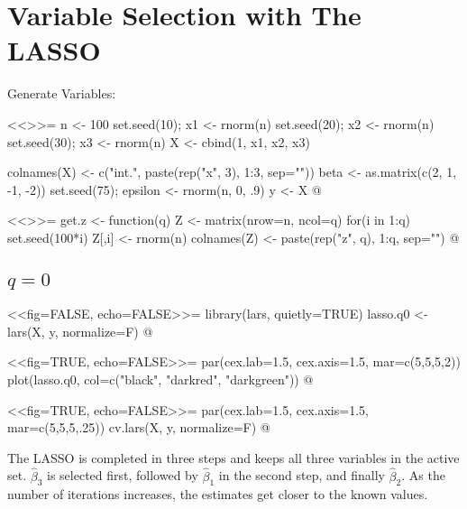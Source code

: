 
\setlength{\parindent}{0pt}
\vspace{-50pt}
\maketitle

\section{Variable Selection with The LASSO}
Generate Variables:\\
\begin{minipage}[t]{0.45\linewidth}
<<>>=
n <- 100
set.seed(10); x1 <- rnorm(n)
set.seed(20); x2 <- rnorm(n)
set.seed(30); x3 <- rnorm(n)
X <- cbind(1, x1, x2, x3)

colnames(X) <- c("int.",
                 paste(rep("x", 3),
                       1:3, sep=""))
beta <- as.matrix(c(2, 1, -1, -2))
set.seed(75); epsilon <- rnorm(n, 0, .9)
y <- X %
@
\end{minipage}
\hfill
\vline
\hfill
\begin{minipage}[t]{0.45\linewidth}
<<>>=
get.z <- function(q){
    Z <- matrix(nrow=n, ncol=q)
    for(i in 1:q){
        set.seed(100*i)
        Z[,i] <- rnorm(n)
    }
    colnames(Z) <- paste(rep("z", q),
                         1:q, sep="")
}
@
\end{minipage}

\subsection{$q=0$}
\vspace{-20pt}
<<fig=FALSE, echo=FALSE>>=
library(lars, quietly=TRUE)
lasso.q0 <- lars(X, y, normalize=F)
@

\begin{minipage}[c]{0.5\linewidth}
<<fig=TRUE, echo=FALSE>>=
par(cex.lab=1.5, cex.axis=1.5, mar=c(5,5,5,2))
plot(lasso.q0, col=c("black", "darkred", "darkgreen"))
@
\end{minipage}
\hfill
\begin{minipage}[c]{0.5\linewidth}
<<fig=TRUE, echo=FALSE>>=
par(cex.lab=1.5, cex.axis=1.5, mar=c(5,5,5,.25))
cv.lars(X, y, normalize=F)
@
\end{minipage}

The LASSO is completed in three steps and keeps all three variables in the active set.
$\hat{\beta}_3$ is selected first, followed by $\hat{\beta}_1$ in the second step,
and finally $\hat{\beta}_2$.  As the number of iterations increases, the estimates
get closer to the known values.

